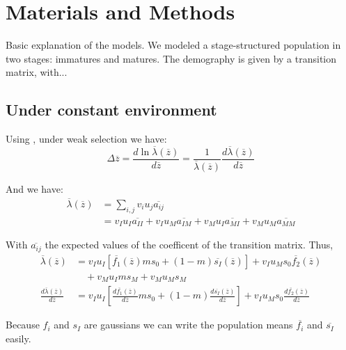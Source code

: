 \section*{Materials and Methods}

Basic explanation of the models. We modeled a stage-structured population in two stages: immatures and matures. The demography is given by a transition matrix, with...

\subsection*{Under constant environment}

Using \citet{lande_adaptation_2009}, under weak selection we have:
\begin{equation}
	\label{eq:dz}
	\Delta\overline{z} = \frac{d\ln\overline{\lambda}(\overline{z})}{d\overline{z}} = \frac{1}{\overline{\lambda}(\overline{z})} \frac{d\overline{\lambda}(\overline{z})}{d\overline{z}}
\end{equation}

And we have:
\begin{align*}
	\overline{\lambda}(\overline{z}) &= \sum_{i,j}{v_{i} u_{j} \overline{a_{ij}}} \\
	&= v_{I} u_{I} \overline{a_{II}} + v_{I} u_{M} \overline{a_{IM}} + v_{M} u_{I} \overline{a_{MI}} + v_{M} u_{M} \overline{a_{MM}}
\end{align*}

With $\overline{a_{ij}}$ the expected values of the coefficent of the transition matrix. Thus,
\begin{align}
	\overline{\lambda}(\overline{z}) &= v_{I} u_{I} \left[ \overline{f_{1}}(\overline{z}) m s_{0} + (1-m) \overline{s_{I}}(\overline{z}) \right] + v_{I} u_{M} s_{0} \overline{f_{2}}(\overline{z}) \nonumber \\
	&\quad + v_{M} u_{I} m s_{M} + v_{M} u_{M} s_M \\
	\label{eq:dlambda}
	\frac{d\overline{\lambda}(\overline{z})}{d\overline{z}} &= v_{I} u_{I} \left[ \frac{d\overline{f_{1}}(\overline{z})}{d\overline{z}} m s_{0} + (1-m) \frac{d\overline{s_{I}}(\overline{z})}{d\overline{z}} \right] + v_{I} u_{M} s_{0} \frac{d\overline{f_{2}}(\overline{z})}{d\overline{z}}
\end{align}

Because $f_{i}$ and $s_{I}$ are gaussians we can write the population means $\overline{f_{i}}$ and $\overline{s_{I}}$ easily.

